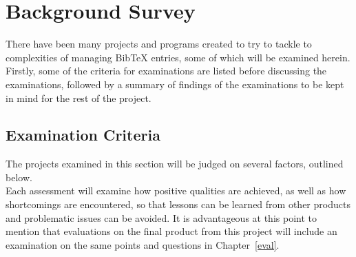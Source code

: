 \documentclass{l4proj}
\newcommand{\BibTeX}{B{\sc ib}\TeX}
\newcommand{\bibtex}{\BibTeX}
\begin{document}

\chapter{Background Survey}
\label{backgrnd}
There have been many projects and programs created to try to tackle to complexities of managing \bibtex{} entries, some of which will be examined herein.  Firstly, some of the criteria for examinations are listed before discussing the examinations, followed by a summary of findings of the examinations to be kept in mind for the rest of the project.

\section{Examination Criteria}
The projects examined in this section will be judged on several factors, outlined below.\\
Each assessment will examine how positive qualities are achieved, as well as how shortcomings are encountered, so that lessons can be learned from other products and problematic issues can be avoided.  It is advantageous at this point to mention that evaluations on the final product from this project will include an examination on the same points and questions in Chapter~\ref{eval}.
\end{document}
